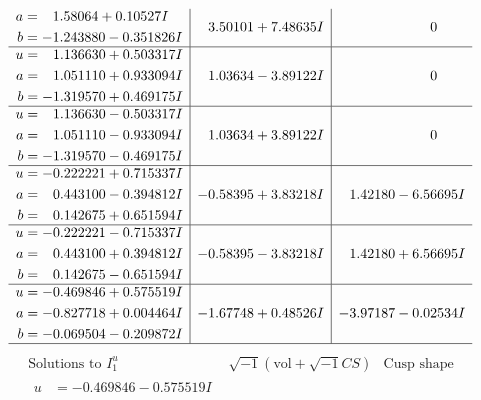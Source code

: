 \documentclass[1p]{elsarticle_modified}
\theoremstyle{definition}
\newcommand{\I}{\sqrt{-1}}
\begin{document}
$$\begin{array}{c|c|c}
\begin{aligned}
a &= \phantom{-}1.58064 + 0.10527 I \\
b &= -1.243880 - 0.351826 I\end{aligned}
 & \phantom{-}3.50101 + 7.48635 I & \phantom{-0.000000 } 0 \\ \hline\begin{aligned}
u &= \phantom{-}1.136630 + 0.503317 I \\
a &= \phantom{-}1.051110 + 0.933094 I \\
b &= -1.319570 + 0.469175 I\end{aligned}
 & \phantom{-}1.03634 - 3.89122 I & \phantom{-0.000000 } 0 \\ \hline\begin{aligned}
u &= \phantom{-}1.136630 - 0.503317 I \\
a &= \phantom{-}1.051110 - 0.933094 I \\
b &= -1.319570 - 0.469175 I\end{aligned}
 & \phantom{-}1.03634 + 3.89122 I & \phantom{-0.000000 } 0 \\ \hline\begin{aligned}
u &= -0.222221 + 0.715337 I \\
a &= \phantom{-}0.443100 - 0.394812 I \\
b &= \phantom{-}0.142675 + 0.651594 I\end{aligned}
 & -0.58395 + 3.83218 I & \phantom{-}1.42180 - 6.56695 I \\ \hline\begin{aligned}
u &= -0.222221 - 0.715337 I \\
a &= \phantom{-}0.443100 + 0.394812 I \\
b &= \phantom{-}0.142675 - 0.651594 I\end{aligned}
 & -0.58395 - 3.83218 I & \phantom{-}1.42180 + 6.56695 I \\ \hline\begin{aligned}
u &= -0.469846 + 0.575519 I \\
a &= -0.827718 + 0.004464 I \\
b &= -0.069504 - 0.209872 I\end{aligned}
 & -1.67748 + 0.48526 I & -3.97187 - 0.02534 I\\
 \hline 
 \end{array}$$\newpage$$\begin{array}{c|c|c}  
\text{Solutions to }I^u_{1}& \I (\text{vol} + \sqrt{-1}CS) & \text{Cusp shape}\\
 \hline 
\begin{aligned}
u &= -0.469846 - 0.575519 I \\

\end{aligned}
\end{array}$$
\end{document}
